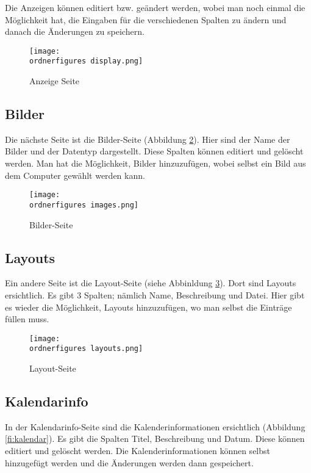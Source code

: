 Die Anzeigen können editiert bzw. geändert werden, wobei man noch einmal die Möglichkeit hat, die Eingaben für die verschiedenen Spalten zu ändern und danach die Änderungen zu speichern.

\begin{figure}[H]
	\centering
	\texttt{[image: \\ordnerfigures display.png]}
	\caption{Anzeige Seite}
	\label{fi:anzeige}
\end{figure}


\subsection{Bilder}

Die nächste Seite ist die Bilder-Seite (Abbildung \ref{fi:images}). Hier sind der Name der Bilder und der Datentyp dargestellt. Diese Spalten können editiert und gelöscht werden. Man hat die Möglichkeit, Bilder hinzuzufügen, wobei selbst ein Bild aus dem Computer gewählt werden kann.

\begin{figure}[H]
	\centering
	\texttt{[image: \\ordnerfigures images.png]}
	\caption{Bilder-Seite}
	\label{fi:images}
\end{figure}


\subsection{Layouts}
Ein andere Seite ist die Layout-Seite (siehe Abbinldung \ref{fi:layouts}). Dort sind Layouts ersichtlich. Es gibt 3 Spalten; nämlich Name, Beschreibung und Datei. Hier gibt es wieder die Möglichkeit, Layouts hinzuzufügen, wo man selbst die Einträge füllen muss.

\begin{figure}[H]
	\centering
	\texttt{[image: \\ordnerfigures layouts.png]}
	\caption{Layout-Seite}
	\label{fi:layouts}
\end{figure}

\subsection{Kalendarinfo}

In der Kalendarinfo-Seite sind die Kalenderinformationen ersichtlich (Abbildung \ref{fi:kalendar}). Es gibt die Spalten Titel, Beschreibung und Datum. Diese können editiert und gelöscht werden. Die Kalenderinformationen können selbst hinzugefügt werden und die Änderungen werden dann gespeichert.

